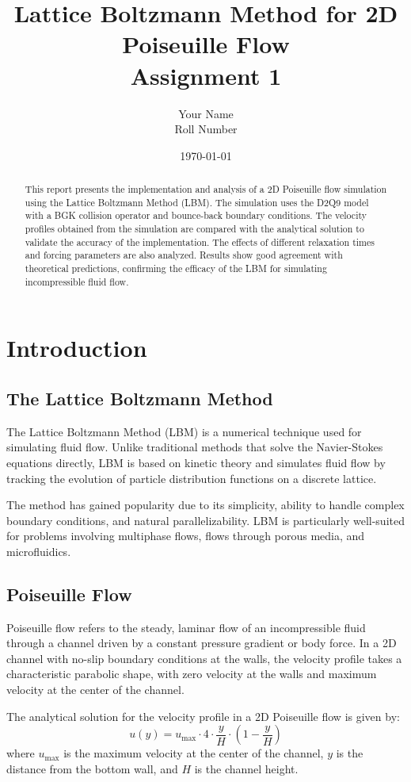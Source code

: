 \documentclass[12pt]{article}
\title{Lattice Boltzmann Method for 2D Poiseuille Flow\\
Assignment 1}
\author{Your Name\\
Roll Number}
\date{\today}
\begin{document}
\maketitle

\begin{abstract}
This report presents the implementation and analysis of a 2D Poiseuille flow simulation using the Lattice Boltzmann Method (LBM). The simulation uses the D2Q9 model with a BGK collision operator and bounce-back boundary conditions. The velocity profiles obtained from the simulation are compared with the analytical solution to validate the accuracy of the implementation. The effects of different relaxation times and forcing parameters are also analyzed. Results show good agreement with theoretical predictions, confirming the efficacy of the LBM for simulating incompressible fluid flow.
\end{abstract}

\section{Introduction}
\subsection{The Lattice Boltzmann Method}
The Lattice Boltzmann Method (LBM) is a numerical technique used for simulating fluid flow. Unlike traditional methods that solve the Navier-Stokes equations directly, LBM is based on kinetic theory and simulates fluid flow by tracking the evolution of particle distribution functions on a discrete lattice.

The method has gained popularity due to its simplicity, ability to handle complex boundary conditions, and natural parallelizability. LBM is particularly well-suited for problems involving multiphase flows, flows through porous media, and microfluidics.

\subsection{Poiseuille Flow}
Poiseuille flow refers to the steady, laminar flow of an incompressible fluid through a channel driven by a constant pressure gradient or body force. In a 2D channel with no-slip boundary conditions at the walls, the velocity profile takes a characteristic parabolic shape, with zero velocity at the walls and maximum velocity at the center of the channel.

The analytical solution for the velocity profile in a 2D Poiseuille flow is given by:
\begin{equation}
u(y) = u_{\text{max}} \cdot 4 \cdot \frac{y}{H} \cdot \left(1 - \frac{y}{H}\right)
\end{equation}
where $u_{\text{max}}$ is the maximum velocity at the center of the channel, $y$ is the distance from the bottom wall, and $H$ is the channel height.
\end{document}
